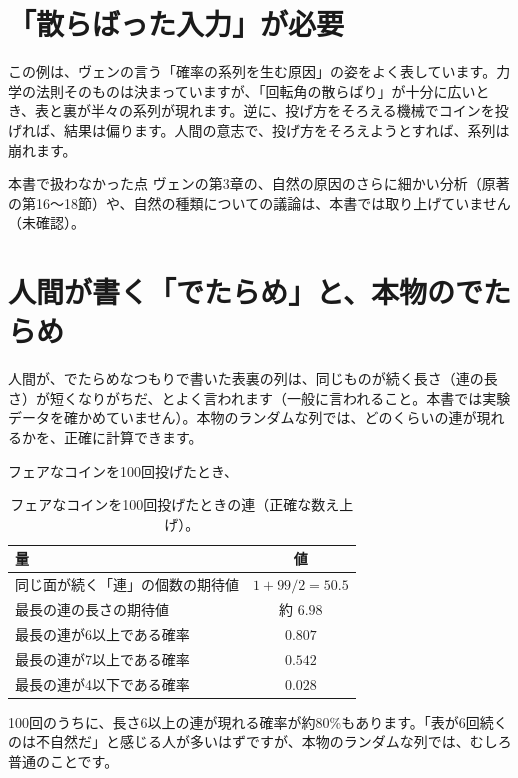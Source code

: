 \documentclass[a4paper,11pt,openany]{ltjsbook}
\begin{document}
\section{「散らばった入力」が必要}

この例は、ヴェンの言う「確率の系列を生む原因」の姿をよく表しています。力学の法則そのものは決まっていますが、「回転角の散らばり」が十分に広いとき、表と裏が半々の系列が現れます。逆に、投げ方をそろえる機械でコインを投げれば、結果は偏ります。人間の意志で、投げ方をそろえようとすれば、系列は崩れます。

\begin{notebox}{本書で扱わなかった点}
ヴェンの第3章の、自然の原因のさらに細かい分析（原著の第16〜18節）や、自然の種類についての議論は、本書では取り上げていません（未確認）。
\end{notebox}

\section{人間が書く「でたらめ」と、本物のでたらめ}

人間が、でたらめなつもりで書いた表裏の列は、同じものが続く長さ（連の長さ）が短くなりがちだ、とよく言われます（一般に言われること。本書では実験データを確かめていません）。本物のランダムな列では、どのくらいの連が現れるかを、正確に計算できます。

フェアなコインを100回投げたとき、

\begin{table}[htbp]
\centering
\begin{tabular}{lc}
\toprule
量 & 値\\
\midrule
同じ面が続く「連」の個数の期待値 & $1+99/2=50.5$\\
最長の連の長さの期待値 & 約 $6.98$\\
最長の連が6以上である確率 & $0.807$\\
最長の連が7以上である確率 & $0.542$\\
最長の連が4以下である確率 & $0.028$\\
\bottomrule
\end{tabular}
\caption{フェアなコインを100回投げたときの連（正確な数え上げ）。}
\end{table}

100回のうちに、長さ6以上の連が現れる確率が約80\%もあります。「表が6回続くのは不自然だ」と感じる人が多いはずですが、本物のランダムな列では、むしろ普通のことです。
\end{document}
